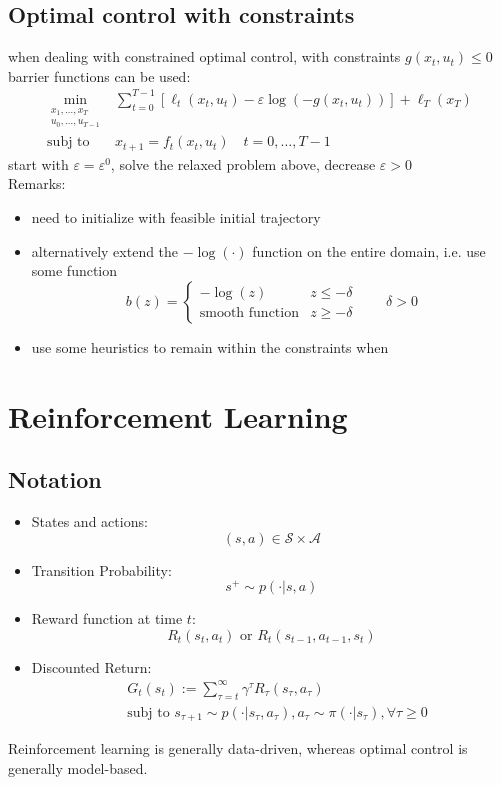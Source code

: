 \documentclass[openany]{book}
\theoremstyle{definition}
\theoremstyle{remark}
\begin{document}
\section{Optimal control with constraints}
when dealing with constrained optimal control, with constraints $g(x_t,u_t)\leq 0$ barrier functions can be used: 
\begin{align*}
    \min_{\substack{x_1,\dots,x_T\\u_0,...,u_{T-1}}} & \displaystyle\sum_{t=0}^{T-1}[\ell_t(x_t,u_t)-\varepsilon\log(-g(x_t,u_t))]+\ell_T(x_T)\\
    \text{subj to } &x_{t+1}=f_t(x_t,u_t) \quad t=0,\dots,T-1
\end{align*}
start with $\varepsilon=\varepsilon^0$, solve the relaxed problem above, decrease $\varepsilon>0$\\
Remarks: \begin{itemize}
    \item need to initialize with feasible initial trajectory 
        \item alternatively extend the $-\log(\cdot)$ function on the entire domain, i.e. use some function \[
            b(z)= \begin{cases}
                -\log(z) & z\leq -\delta\\
                \text{smooth function} & z\geq -\delta
            \end{cases} \qquad \delta>0
        \]
        \item use some heuristics to remain within the constraints when
\end{itemize}


\chapter{Reinforcement Learning}
\section{Notation}
\begin{itemize}
    \item States and actions:
        \[
            (s,a)\in\mathcal{S}\times\mathcal{A}
        \]
        \item Transition Probability:
            \[
                s^+ \sim p(\cdot|s,a)
            \]
        \item Reward function at time $t$:
            \[
                R_t(s_t,a_t) \text{ or } R_t(s_{t-1},a_{t-1},s_t)
            \]
            
            \item Discounted Return: \begin{align*}
               &G_t(s_t):=\displaystyle\sum_{\tau=t}^{\infty}\gamma^\tau R_\tau(s_\tau,a_\tau) \\
               &\text{subj to } s_{\tau+1}\sim p(\cdot|s_\tau,a_\tau),a_\tau\sim \pi(\cdot|s_\tau),\forall \tau \geq 0
            \end{align*}
                
\end{itemize}
Reinforcement learning is generally data-driven, whereas optimal control is generally model-based.
\end{document}
